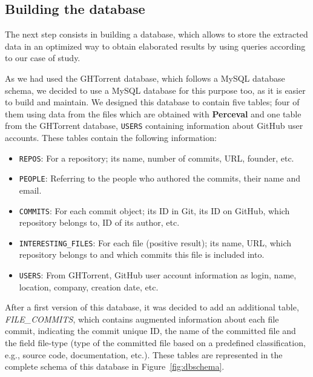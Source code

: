 \documentclass[a4paper, 12pt]{book}
\begin{document}
\subsection{Building the database}
\label{ssec:build-database}

The next step consists in building a database, which allows to store the extracted data in an optimized way to
obtain elaborated results by using queries according to our case of study.

As we had used the GHTorrent database, which follows a MySQL database schema, we decided to use a MySQL database
for this purpose too, as it is easier to build and maintain.
We designed this database to contain five tables; four of them using data from the files which are obtained with
\textbf{Perceval} and one table from the GHTorrent database, \texttt{USERS} containing information about GitHub user accounts.
These tables contain the following information:
\begin{itemize}
  \item \texttt{REPOS}: For a repository; its name, number of commits, URL, founder, etc.
  \item \texttt{PEOPLE}: Referring to the people who authored the commits, their name and email.
  \item \texttt{COMMITS}: For each commit object; its ID in Git, its ID on GitHub, which repository belongs to, ID of its author, etc.
  \item \texttt{INTERESTING\_FILES}: For each file (positive result); its name, URL, which repository belongs to and which commits this file is included into.
  \item \texttt{USERS}: From GHTorrent, GitHub user account information as login, name, location, company, creation date, etc.
\end{itemize}

After a first version of this database, it was decided to add an additional table, \textit{FILE\_COMMITS},
which contains augmented information about each file commit, indicating the commit unique ID, the name of the committed file and the field
file-type (type of the committed file based on a predefined classification, e.g., source code, documentation, etc.).
These tables are represented in the complete schema of this database in Figure~\ref{fig:dbschema}.
\end{document}
